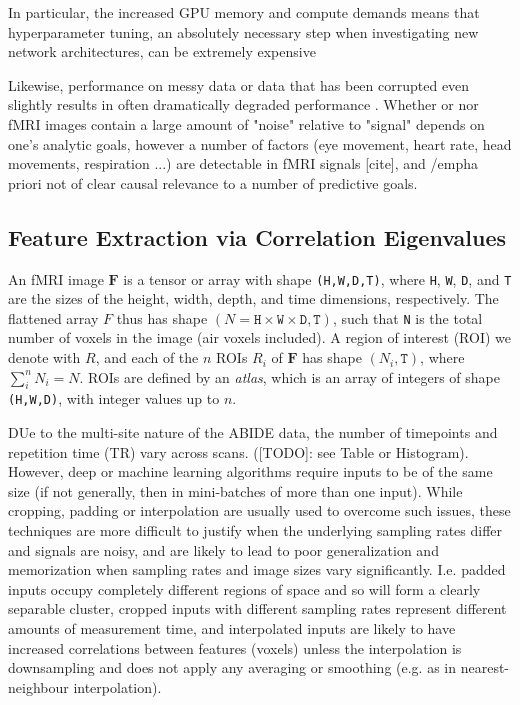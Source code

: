 \documentclass[10pt]{article}
\begin{document}
In particular, the increased GPU memory and compute demands means that hyperparameter tuning, an
absolutely necessary step when investigating new network architectures, can be extremely expensive


Likewise, performance on messy data or data that has been corrupted even slightly results in often
dramatically degraded performance
\citep{metzUsingLearnedOptimizers2019,dodgeStudyComparisonHuman2017,hendrycksBenchmarkingNeuralNetwork2019,azulayWhyDeepConvolutional2019,rosenfeldElephantRoom2018}.
Whether or nor fMRI images contain a large amount of "noise" relative to "signal" depends on one's
analytic goals, however a number of factors (eye movement, heart rate, head movements, respiration
...) are detectable in fMRI signals [cite], and /emph{a priori} not of clear causal relevance to a
number of predictive goals.


\subsection{Feature Extraction via Correlation Eigenvalues}

An fMRI image \(\bm{F}\) is a tensor or array with shape \texttt{(H,W,D,T)}, where \texttt{H},
\texttt{W}, \texttt{D}, and \texttt{T} are the sizes of the height, width, depth, and time
dimensions, respectively. The flattened array \(F\) thus has shape \((N = \texttt{H} \times
\texttt{W} \times \texttt{D}, \texttt{T})\), such that \texttt{N} is the total number of voxels in
the image (air voxels included). A region of interest (ROI) we denote with \(R\), and each of the
\(n\) ROIs \(R_i\) of \(\bm{F}\) has shape \((N_i, \texttt{T})\), where \(\sum_i^n N_i= N\). ROIs
are defined by an \emph{atlas}, which is an array of integers of shape \texttt{(H,W,D)}, with
integer values up to \(n\).

DUe to the multi-site nature of the ABIDE data, the number of timepoints and repetition time (TR)
vary across scans. ([TODO]: see Table or Histogram). However, deep or machine learning algorithms
require inputs to be of the same size (if not generally, then in mini-batches of more than one
input). While cropping, padding or interpolation are usually used to overcome such issues, these
techniques are more difficult to justify when the underlying sampling rates differ and signals are
noisy, and are likely to lead to poor generalization and memorization when sampling rates and image
sizes vary significantly. I.e. padded inputs occupy completely different regions of space and so
will form a clearly separable cluster, cropped inputs with different sampling rates represent
different amounts of measurement time, and interpolated inputs are likely to have increased
correlations between features (voxels) unless the interpolation is downsampling and does not apply
any averaging or smoothing (e.g. as in nearest-neighbour interpolation).
\end{document}
